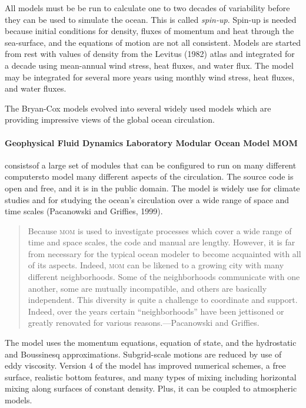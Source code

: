 All models must be be run to calculate one to two decades of
variability before they can be used to simulate the ocean. This is
called \textit{spin-up}.
Spin-up is needed because initial conditions for density, fluxes of
momentum and heat through the sea-surface, and the equations of motion
are not all consistent. Models are started from rest with values of
density from the Levitus (1982) atlas and integrated for a decade
using mean-annual wind stress, heat
fluxes, and water flux. The model may be integrated
for several more years using monthly wind stress, heat
fluxes, and water fluxes.

The Bryan-Cox models
evolved into several widely used models which are providing impressive
views of the global ocean circulation.

\paragraph{Geophysical Fluid Dynamics Laboratory Modular Ocean Model MOM}
consistsof a large set
of modules that can be configured to run on many different computersto
model many different aspects of the circulation. The source code is
open and free, and it is in the public domain. The model is widely use
for climate studies and for studying the ocean's circulation over a
wide range of space and time scales (Pacanowski and Griffies, 1999).
\begin{quote} \small
Because \textsc{mom} is used to investigate processes which cover a
wide range of time and space scales, the code and manual are
lengthy. However, it is far from necessary for the typical ocean
modeler to become acquainted with all of its aspects. Indeed,
\textsc{mom} can be likened to a growing city with many different
neighborhoods. Some of the neighborhoods communicate with one another,
some are mutually incompatible, and others are basically
independent. This diversity is quite a challenge to coordinate and
support. Indeed, over the years certain ``neighborhoods'' have been
jettisoned or greatly renovated for various reasons.---Pacanowski and
Griffies.
\end{quote}

The model uses the momentum equations, equation of state, and the
hydrostatic and Boussinesq approximations. Subgrid-scale motions are reduced by use of eddy
viscosity. Version 4 of the model has improved numerical schemes, a
free surface, realistic bottom features, and many types of
mixing including horizontal
mixing along surfaces of
constant density. Plus, it can be coupled to atmospheric models.

